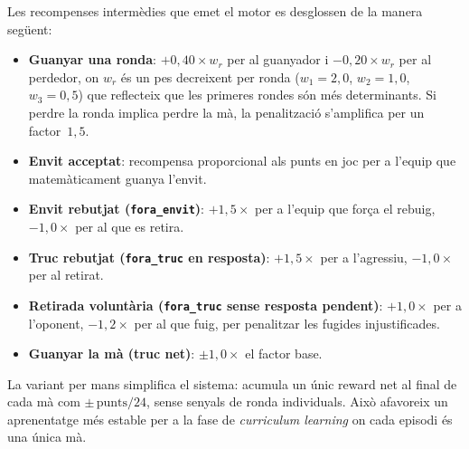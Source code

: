 Les recompenses intermèdies que emet el motor es desglossen de la manera següent:

\begin{itemize}
  \item \textbf{Guanyar una ronda}: $+0{,}40 \times w_r$ per al guanyador i
        $-0{,}20 \times w_r$ per al perdedor, on $w_r$ és un pes decreixent
        per ronda ($w_1=2{,}0$, $w_2=1{,}0$, $w_3=0{,}5$) que reflecteix que
        les primeres rondes són més determinants. Si perdre la ronda implica
        perdre la mà, la penalització s'amplifica per un factor~$1{,}5$.

  \item \textbf{Envit acceptat}: recompensa proporcional als punts en joc per
        a l'equip que matemàticament guanya l'envit.

  \item \textbf{Envit rebutjat (\texttt{fora\_envit})}: $+1{,}5\times$ per a
        l'equip que força el rebuig, $-1{,}0\times$ per al que es retira.

  \item \textbf{Truc rebutjat (\texttt{fora\_truc} en resposta)}: $+1{,}5\times$
        per a l'agressiu, $-1{,}0\times$ per al retirat.

  \item \textbf{Retirada voluntària (\texttt{fora\_truc} sense resposta pendent)}:
        $+1{,}0\times$ per a l'oponent, $-1{,}2\times$ per al que fuig, per
        penalitzar les fugides injustificades.

  \item \textbf{Guanyar la mà (truc net)}: $\pm 1{,}0\times$ el factor base.
\end{itemize}

La variant per mans simplifica el sistema: acumula un únic reward net al final de
cada mà com $\pm\,\text{punts}/24$, sense senyals de ronda individuals. Això afavoreix
un aprenentatge més estable per a la fase de \emph{curriculum learning} on cada
episodi és una única mà.
